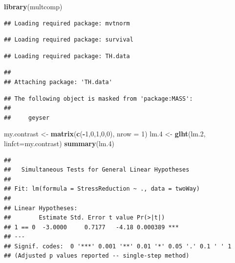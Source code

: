 \documentclass[]{book}
\newenvironment{Shaded}{\begin{snugshade}}{\end{snugshade}}
\newcommand{\DataTypeTok}[1]{\textcolor[rgb]{0.13,0.29,0.53}{#1}}
\newcommand{\DecValTok}[1]{\textcolor[rgb]{0.00,0.00,0.81}{#1}}
\newcommand{\FloatTok}[1]{\textcolor[rgb]{0.00,0.00,0.81}{#1}}
\newcommand{\KeywordTok}[1]{\textcolor[rgb]{0.13,0.29,0.53}{\textbf{#1}}}
\newcommand{\NormalTok}[1]{#1}
\newcommand{\OperatorTok}[1]{\textcolor[rgb]{0.81,0.36,0.00}{\textbf{#1}}}
\newcommand{\StringTok}[1]{\textcolor[rgb]{0.31,0.60,0.02}{#1}}
\theoremstyle{definition}
\theoremstyle{definition}
\theoremstyle{definition}
\theoremstyle{remark}
\begin{document}
\begin{Shaded}
\begin{Highlighting}[]
\KeywordTok{library}\NormalTok{(multcomp)}
\end{Highlighting}
\end{Shaded}

\begin{verbatim}
## Loading required package: mvtnorm
\end{verbatim}

\begin{verbatim}
## Loading required package: survival
\end{verbatim}

\begin{verbatim}
## Loading required package: TH.data
\end{verbatim}

\begin{verbatim}
## 
## Attaching package: 'TH.data'
\end{verbatim}

\begin{verbatim}
## The following object is masked from 'package:MASS':
## 
##     geyser
\end{verbatim}

\begin{Shaded}
\begin{Highlighting}[]
\NormalTok{my.contrast <-}\StringTok{ }\KeywordTok{matrix}\NormalTok{(}\KeywordTok{c}\NormalTok{(}\OperatorTok{-}\DecValTok{1}\NormalTok{,}\DecValTok{0}\NormalTok{,}\DecValTok{1}\NormalTok{,}\DecValTok{0}\NormalTok{,}\DecValTok{0}\NormalTok{), }\DataTypeTok{nrow =}  \DecValTok{1}\NormalTok{)}
\NormalTok{lm}\FloatTok{.4}\NormalTok{ <-}\StringTok{ }\KeywordTok{glht}\NormalTok{(lm}\FloatTok{.2}\NormalTok{, }\DataTypeTok{linfct=}\NormalTok{my.contrast)}
\KeywordTok{summary}\NormalTok{(lm}\FloatTok{.4}\NormalTok{)}
\end{Highlighting}
\end{Shaded}

\begin{verbatim}
## 
##   Simultaneous Tests for General Linear Hypotheses
## 
## Fit: lm(formula = StressReduction ~ ., data = twoWay)
## 
## Linear Hypotheses:
##        Estimate Std. Error t value Pr(>|t|)    
## 1 == 0  -3.0000     0.7177   -4.18 0.000389 ***
## ---
## Signif. codes:  0 '***' 0.001 '**' 0.01 '*' 0.05 '.' 0.1 ' ' 1
## (Adjusted p values reported -- single-step method)
\end{verbatim}
\end{document}
